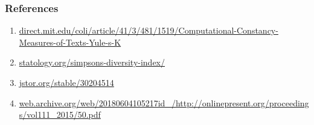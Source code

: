 \documentclass{article}
\begin{document}
\begin{titlepage}
\subsubsection{References}

\begin{enumerate}
\item \url{direct.mit.edu/coli/article/41/3/481/1519/Computational-Constancy-Measures-of-Texts-Yule-s-K}
\item \url{statology.org/simpsons-diversity-index/}
\item \url{jstor.org/stable/30204514}
\item \url{web.archive.org/web/20180604105217id_/http://onlinepresent.org/proceedings/vol111_2015/50.pdf}
\end{enumerate}

\end{titlepage}
\end{document}
